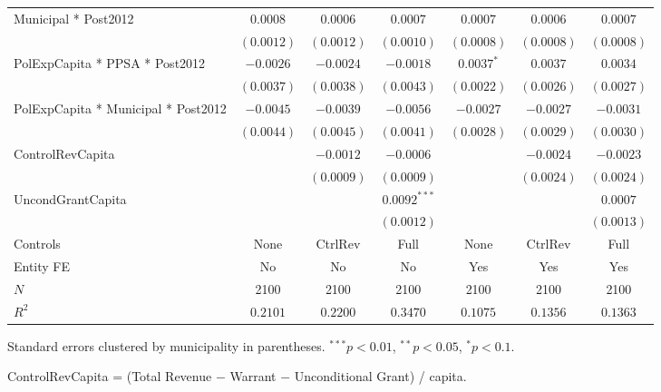 \documentclass[border=10pt,varwidth=25cm]{standalone}
\renewenvironment{table}[1][]{}{}
\begin{document}
\begin{table}[H]
\begin{minipage}{\textwidth}
\begin{tabular}{lcccccc}
        Municipal * Post2012 & $0.0008$ & $0.0006$ & $0.0007$ & $0.0007$ & $0.0006$ & $0.0007$ \\
         & $(0.0012)$ & $(0.0012)$ & $(0.0010)$ & $(0.0008)$ & $(0.0008)$ & $(0.0008)$ \\[4pt]
        PolExpCapita * PPSA * Post2012 & $-0.0026$ & $-0.0024$ & $-0.0018$ & $0.0037^{*}$ & $0.0037$ & $0.0034$ \\
         & $(0.0037)$ & $(0.0038)$ & $(0.0043)$ & $(0.0022)$ & $(0.0026)$ & $(0.0027)$ \\[4pt]
        PolExpCapita * Municipal * Post2012 & $-0.0045$ & $-0.0039$ & $-0.0056$ & $-0.0027$ & $-0.0027$ & $-0.0031$ \\
         & $(0.0044)$ & $(0.0045)$ & $(0.0041)$ & $(0.0028)$ & $(0.0029)$ & $(0.0030)$ \\[4pt]
        ControlRevCapita &  & $-0.0012$ & $-0.0006$ &  & $-0.0024$ & $-0.0023$ \\
         &  & $(0.0009)$ & $(0.0009)$ &  & $(0.0024)$ & $(0.0024)$ \\[4pt]
        UncondGrantCapita &  &  & $0.0092^{***}$ &  &  & $0.0007$ \\
         &  &  & $(0.0012)$ &  &  & $(0.0013)$ \\[4pt]
        \midrule
        Controls & None & CtrlRev & Full & None & CtrlRev & Full \\
        Entity FE & No & No & No & Yes & Yes & Yes \\
        $N$ & 2100 & 2100 & 2100 & 2100 & 2100 & 2100 \\
        $R^2$ & $0.2101$ & $0.2200$ & $0.3470$ & $0.1075$ & $0.1356$ & $0.1363$ \\
        \bottomrule
    \end{tabular}

    \vspace{6pt}
    {\scriptsize Standard errors clustered by municipality in parentheses. $^{***}p<0.01$, $^{**}p<0.05$, $^{*}p<0.1$.}

    {\scriptsize ControlRevCapita = (Total Revenue $-$ Warrant $-$ Unconditional Grant) / capita.}
    \end{minipage}
\end{table}
\end{document}
